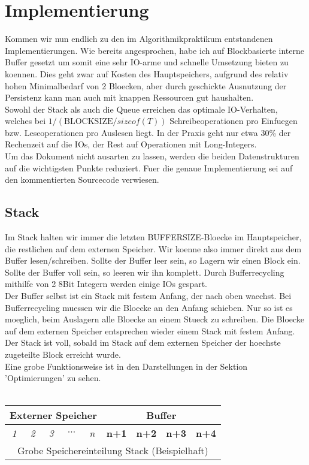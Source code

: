 \documentclass[10pt,a4paper]{article}
\begin{document}
\section{Implementierung}
Kommen wir nun endlich zu den im Algorithmikpraktikum entstandenen Implementierungen. Wie bereits angesprochen, habe ich auf Blockbasierte interne Buffer gesetzt um somit eine sehr IO-arme und schnelle Umsetzung bieten zu koennen. Dies geht zwar auf Kosten des Hauptspeichers, aufgrund des relativ hohen Minimalbedarf von 2 Bloecken, aber durch geschickte Ausnutzung der Persistenz kann man auch mit knappen Ressourcen gut haushalten. \\
Sowohl der Stack als auch die Queue erreichen das optimale IO-Verhalten, welches bei $1/(\text{BLOCKSIZE}/sizeof(T))$ Schreibeoperationen pro Einfuegen bzw. Leseoperationen pro Auslesen liegt. In der Praxis geht nur etwa 30\% der Rechenzeit auf die IOs, der Rest auf Operationen mit Long-Integers.\\
Um das Dokument nicht ausarten zu lassen, werden die beiden Datenstrukturen auf die wichtigsten Punkte reduziert. Fuer die genaue Implementierung sei auf den kommentierten Sourcecode verwiesen.
\subsection{Stack}
Im Stack halten wir immer die letzten BUFFERSIZE-Bloecke im Hauptspeicher, die restlichen auf dem externen Speicher. Wir koenne also immer direkt aus dem Buffer lesen/schreiben. Sollte der Buffer leer sein, so Lagern wir einen Block ein. Sollte der Buffer voll sein, so leeren wir ihn komplett. Durch Bufferrecycling mithilfe von 2 8Bit Integern werden einige IOs gespart. \\
Der Buffer selbst ist ein Stack mit festem Anfang, der nach oben waechst. Bei Bufferrecycling muessen wir die Bloecke an den Anfang schieben. Nur so ist es moeglich, beim Auslagern alle Bloecke an einem Stueck zu schreiben. Die Bloecke auf dem externen Speicher entsprechen wieder einem Stack mit festem Anfang. Der Stack ist voll, sobald im Stack auf dem externen Speicher der hoechste zugeteilte Block erreicht wurde.\\
Eine grobe Funktionsweise ist in den Darstellungen in der Sektion 'Optimierungen' zu sehen.\\
\\
\begin{tabular}{|| c | c | c | c | c || c | c | c | c ||}
\multicolumn{5}{c}{Externer Speicher} & \multicolumn{4}{c}{Buffer} \\
\hline
\it{1} & \it{2} & \it{3} & $\cdots$ & \it{n} & \bf{n+1} & \bf{n+2} & \bf{n+3} & \bf{n+4} \\
\hline
\multicolumn{9}{c}{Grobe Speichereinteilung Stack (Beispielhaft)}
\end{tabular}
\end{document}
